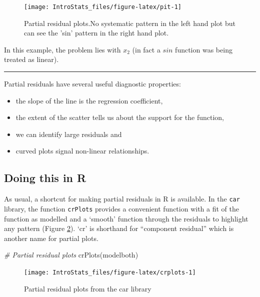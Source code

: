 \documentclass[
  oneside]{krantz}
\newenvironment{Shaded}{\begin{snugshade}}{\end{snugshade}}
\newcommand{\CommentTok}[1]{\textcolor[rgb]{0.56,0.35,0.01}{\textit{#1}}}
\newcommand{\FunctionTok}[1]{\textcolor[rgb]{0.00,0.00,0.00}{#1}}
\newcommand{\NormalTok}[1]{#1}
\providecommand{\tightlist}{%
  \setlength{\itemsep}{0pt}\setlength{\parskip}{0pt}}
\begin{document}
\begin{figure}

{\centering \texttt{[image: IntroStats\_files/figure-latex/pit-1]} 

}

\caption{Partial residual plots.No systematic pattern in the left hand plot but can see the 'sin' pattern in the right hand plot.}\label{fig:pit}
\end{figure}

In this example, the problem lies with \(x_2\) (in fact a \(sin\) function was being treated as linear).

\begin{center}\rule{0.5\linewidth}{0.5pt}\end{center}

Partial residuals have several useful diagnostic properties:

\begin{itemize}
\tightlist
\item
  the slope of the line is the regression coefficient,
\item
  the extent of the scatter tells us about the support for the function,
\item
  we can identify large residuals and
\item
  curved plots signal non-linear relationships.
\end{itemize}

\hypertarget{doing-this-in-r-30}{%
\subsection{Doing this in R}\label{doing-this-in-r-30}}

As usual, a shortcut for making partial residuals in R is available. In the \texttt{car} library, the function \texttt{crPlots} provides a convenient function with a fit of the function as modelled and a `smooth' function through the residuals to highlight any pattern (Figure \ref{fig:crplots}). `cr' is shorthand for ``component residual'' which is another name for partial plots.

\begin{Shaded}
\begin{Highlighting}[]
\CommentTok{\# Partial residual plots}
\FunctionTok{crPlots}\NormalTok{(modelboth)}
\end{Highlighting}
\end{Shaded}

\begin{figure}

{\centering \texttt{[image: IntroStats\_files/figure-latex/crplots-1]} 

}

\caption{Partial residual plots from the car library}\label{fig:crplots}
\end{figure}
\end{document}

